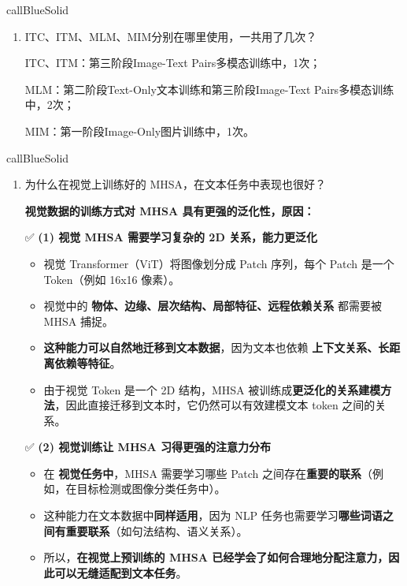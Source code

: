 \documentclass[zihao=false,fontset=windows]{ctexart}
\newcommand{\feiEmoji}[1]{{\emojifont #1}}
\newcommand{\yel}[1]{\colorbox{hiYellow}{#1}}
\begin{document}
\begin{feishubox}{callBlueSolid}{🙋}
\begin{enumerate}
\item \yel{ITC、ITM、MLM、MIM分别在哪里使用，一共用了几次？}\par
ITC、ITM：第三阶段Image-Text Pairs多模态训练中，1次；\par
MLM：第二阶段Text-Only文本训练和第三阶段Image-Text Pairs多模态训练中，2次；\par
MIM：第一阶段Image-Only图片训练中，1次。\par
\end{enumerate}
\end{feishubox}

\begin{feishubox}{callBlueSolid}{🙋}
\begin{enumerate}
\item \yel{为什么在视觉上训练好的 MHSA，在文本任务中表现也很好？}\par
\textbf{视觉数据的训练方式对 MHSA 具有更强的泛化性，原因：}\par
\feiEmoji{✅} \textbf{(1) 视觉 MHSA 需要学习复杂的 2D 关系，能力更泛化}\par
\begin{itemize}
\item 视觉 Transformer（ViT）将图像划分成 Patch 序列，每个 Patch 是一个 Token（例如 16x16 像素）。
\item 视觉中的 \textbf{物体、边缘、层次结构、局部特征、远程依赖关系} 都需要被 MHSA 捕捉。
\item \textbf{这种能力可以自然地迁移到文本数据}，因为文本也依赖 \textbf{上下文关系、长距离依赖等特征}。
\item 由于视觉 Token 是一个 2D 结构，MHSA 被训练成\textbf{更泛化的关系建模方法}，因此直接迁移到文本时，它仍然可以有效建模文本 token 之间的关系。
\end{itemize}
\feiEmoji{✅} \textbf{(2) 视觉训练让 MHSA 习得更强的注意力分布}\par
\begin{itemize}
\item 在 \textbf{视觉任务中}，MHSA 需要学习哪些 Patch 之间存在\textbf{重要的联系}（例如，在目标检测或图像分类任务中）。
\item 这种能力在文本数据中\textbf{同样适用}，因为 NLP 任务也需要学习\textbf{哪些词语之间有重要联系}（如句法结构、语义关系）。
\item 所以，\textbf{在视觉上预训练的 MHSA 已经学会了如何合理地分配注意力，因此可以无缝适配到文本任务}。
\end{itemize}

\end{enumerate}
\end{feishubox}
\end{document}
